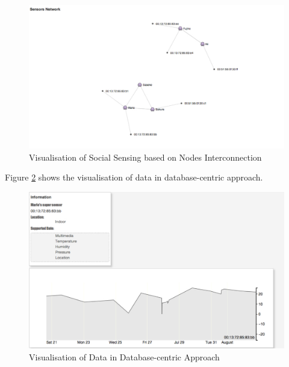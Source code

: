 \begin{figure}[ht]
  \begin{center}
    \includegraphics[width=1\textwidth]{images/screen-shot-social-sensing-netowrk.pdf}
    \caption{Visualisation of Social Sensing based on Nodes Interconnection}
    \label{fig:screen-shot-social-sensing-netowrk}
  \end{center}
\end{figure}
Figure \ref{fig:screen-shot-social-sensing-network-data} shows the visualisation of data in database-centric approach.

\begin{figure}[ht]
  \begin{center}
    \includegraphics[width=1\textwidth]{images/screen-shot-social-sensing-network-data.pdf}
    \caption{Visualisation of Data in Database-centric Approach}
    \label{fig:screen-shot-social-sensing-network-data}
  \end{center}
\end{figure}